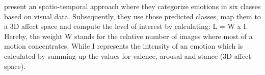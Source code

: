 \newline\newline
\citet{Yeasin:2006:MeasurmentOfInterestFromVideo} present an spatio-temporal approach where they categorize emotions in six classes based on visual data. Subsequently, they use those predicted classes, map them to a 3D affect space and compute the level of interest by calculating: L = W x I.
Hereby, the weight W stands for the relative number of images where most of a motion concentrates. While I represents the intensity of an emotion which is calculated by summing up the values for valence, arousal and stance (3D affect space).



